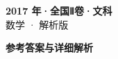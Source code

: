\documentclass[zihao=-4, a4paper]{ctexart}
\begin{document}
\begin{center}
  {\Large\bfseries 2017 年·全国Ⅱ卷·文科}\\[4pt]
  {\large 数学 · 解析版}
\end{center}
\medskip
{}

\clearpage
{}
\begin{center}{\Large\bfseries 参考答案与详细解析}\end{center}
\medskip

\end{document}

